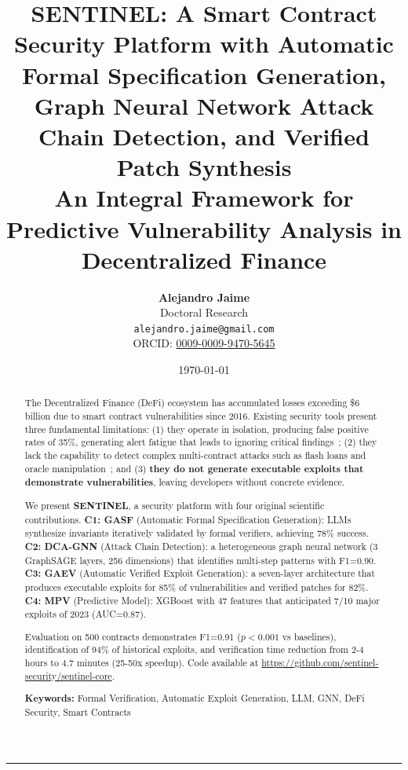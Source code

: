 \documentclass[11pt]{article}
\title{
\textbf{SENTINEL: A Smart Contract Security Platform with Automatic Formal Specification Generation, Graph Neural Network Attack Chain Detection, and Verified Patch Synthesis}\\[0.8em]
\large An Integral Framework for Predictive Vulnerability Analysis in Decentralized Finance
}
\author{
\textbf{Alejandro Jaime}\\
Doctoral Research\\
\texttt{alejandro.jaime@gmail.com}\\[0.3em]
\small ORCID: \href{https://orcid.org/0009-0009-9470-5645}{0009-0009-9470-5645}
}
\date{\today}
\theoremstyle{definition}
\theoremstyle{plain}
\theoremstyle{remark}
\begin{document}
\maketitle

\begin{abstract}
\noindent
The Decentralized Finance (DeFi) ecosystem has accumulated losses exceeding \$6 billion due to smart contract vulnerabilities since 2016. Existing security tools present three fundamental limitations: (1) they operate in isolation, producing false positive rates of 35\%, generating alert fatigue that leads to ignoring critical findings~\cite{durieux2020empirical}; (2) they lack the capability to detect complex multi-contract attacks such as flash loans and oracle manipulation~\cite{qin2021attacking}; and (3) \textbf{they do not generate executable exploits that demonstrate vulnerabilities}, leaving developers without concrete evidence.

We present \textbf{SENTINEL}, a security platform with four original scientific contributions. \textbf{C1: GASF} (Automatic Formal Specification Generation): LLMs synthesize invariants iteratively validated by formal verifiers, achieving 78\% success. \textbf{C2: DCA-GNN} (Attack Chain Detection): a heterogeneous graph neural network (3 GraphSAGE layers, 256 dimensions) that identifies multi-step patterns with F1=0.90. \textbf{C3: GAEV} (Automatic Verified Exploit Generation): a seven-layer architecture that produces executable exploits for 85\% of vulnerabilities and verified patches for 82\%. \textbf{C4: MPV} (Predictive Model): XGBoost with 47 features that anticipated 7/10 major exploits of 2023 (AUC=0.87).

Evaluation on 500 contracts demonstrates F1=0.91 ($p<0.001$ vs baselines), identification of 94\% of historical exploits, and verification time reduction from 2-4 hours to 4.7 minutes (25-50x speedup). Code available at \url{https://github.com/sentinel-security/sentinel-core}.

\vspace{0.5em}
\noindent\textbf{Keywords:} Formal Verification, Automatic Exploit Generation, LLM, GNN, DeFi Security, Smart Contracts
\end{abstract}

\vspace{1em}
\hrule
\vspace{1.5em}

\end{document}
